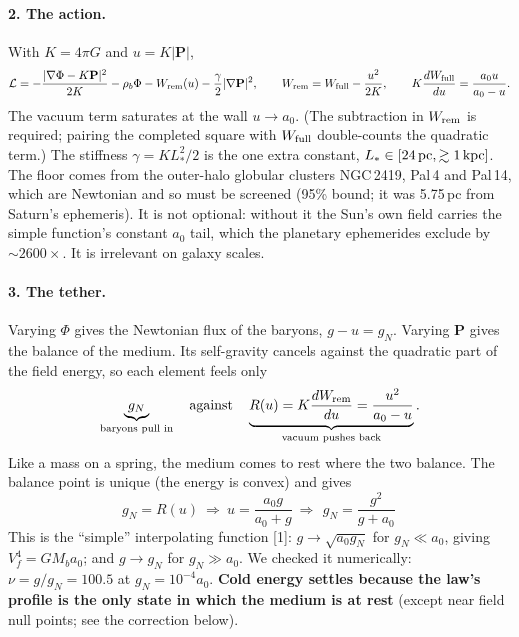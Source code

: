 \documentclass[10pt]{article}
\begin{document}
\paragraph{2. The action.} With $K=4\pi G$ and $u=K|\mathbf P|$,
$$\mathcal L=-\frac{|\nabla\Phi-K\mathbf P|^2}{2K}-\rho_b\Phi-W_{\rm rem}(u)-\frac{\gamma}{2}|\nabla\mathbf P|^2,\qquad W_{\rm rem}=W_{\rm full}-\frac{u^2}{2K},\qquad K\frac{dW_{\rm full}}{du}=\frac{a_0u}{a_0-u}.$$
The vacuum term saturates at the wall $u\to a_0$. (The subtraction in $W_{\rm rem}$ is required; pairing the completed square with $W_{\rm full}$ double-counts the quadratic term.) The stiffness $\gamma=KL_*^2/2$ is the one extra constant, $L_*\in[24\,{\rm pc},\gtrsim1\,{\rm kpc}]$. The floor comes from the outer-halo globular clusters NGC\,2419, Pal\,4 and Pal\,14, which are Newtonian and so must be screened (95\% bound; it was 5.75\,pc from Saturn's ephemeris). It is not optional: without it the Sun's own field carries the simple function's constant $a_0$ tail, which the planetary ephemerides exclude by $\sim2600\times$. It is irrelevant on galaxy scales.

\paragraph{3. The tether.} Varying $\Phi$ gives the Newtonian flux of the baryons, $g-u=g_N$. Varying $\mathbf P$ gives the balance of the medium. Its self-gravity cancels against the quadratic part of the field energy, so each element feels only
$$\underbrace{g_N}_{\text{baryons pull in}}\quad\text{against}\quad\underbrace{R(u)=K\frac{dW_{\rm rem}}{du}=\frac{u^2}{a_0-u}}_{\text{vacuum pushes back}}.$$
Like a mass on a spring, the medium comes to rest where the two balance. The balance point is unique (the energy is convex) and gives
$$g_N=R(u)\ \Longrightarrow\ u=\frac{a_0g}{a_0+g}\ \Longrightarrow\ \boxed{\,g_N=\frac{g^2}{g+a_0}\,}$$
This is the ``simple'' interpolating function [1]: $g\to\sqrt{a_0g_N}$ for $g_N\ll a_0$, giving $V_f^4=GM_ba_0$; and $g\to g_N$ for $g_N\gg a_0$. We checked it numerically: $\nu=g/g_N=100.5$ at $g_N=10^{-4}a_0$. \textbf{Cold energy settles because the law's profile is the only state in which the medium is at rest} (except near field null points; see the correction below).
\end{document}
